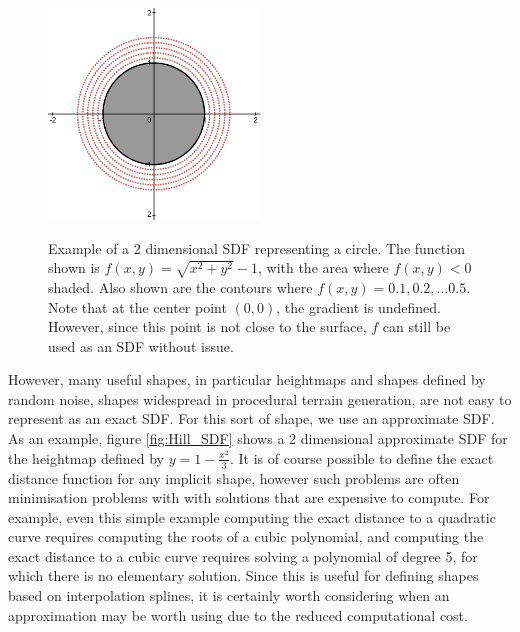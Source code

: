 \documentclass{article}
\begin{document}
\begin{figure}
\caption{Example of a 2 dimensional SDF representing a circle. The function shown is $f\left(x,y\right) = \sqrt{x^2+y^2}-1$, with the area where $f\left(x,y\right) < 0 $ shaded. Also shown are the contours where $f\left(x,y\right) = 0.1,0.2,...0.5$. Note that at the center point $\left(0,0\right)$, the gradient is undefined. However, since this point is not close to the surface, $f$ can still be used as an SDF without issue.}
\includegraphics[width=0.5\textwidth]{Circle_SDF}
\label{fig:Circle_SDF}
\end{figure}

However, many useful shapes, in particular heightmaps and shapes defined by random noise, shapes widespread in procedural terrain generation, are not easy to represent as an exact SDF. For this sort of shape, we use an approximate SDF. As an example, figure \ref{fig:Hill_SDF} shows a 2 dimensional approximate SDF for the heightmap defined by $y=1-\frac{x^2}{3}$. It is of course possible to define the exact distance function for any implicit shape, however such problems are often minimisation problems with with solutions that are expensive to compute. For example, even this simple example computing the exact distance to a quadratic curve requires computing the roots of a cubic polynomial, and computing the exact distance to a cubic curve requires solving a polynomial of degree 5, for which there is no elementary solution. Since this is useful for defining shapes based on interpolation splines, it is certainly worth considering when an approximation may be worth using due to the reduced computational cost.
\end{document}
